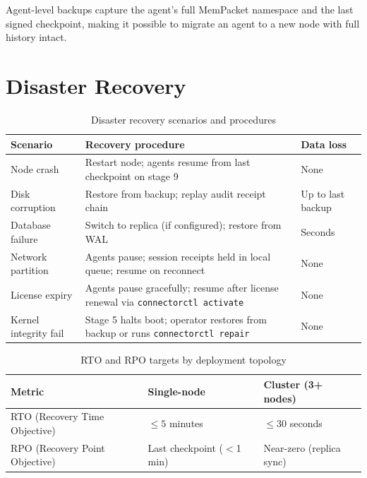 Agent-level backups capture the agent's full MemPacket namespace and the last
signed checkpoint, making it possible to migrate an agent to a new node with
full history intact.

\section{Disaster Recovery}

\begin{table}[H]
\centering
\renewcommand{\arraystretch}{1.5}
\begin{tabularx}{\textwidth}{@{}lXl@{}}
\toprule
\textbf{Scenario} & \textbf{Recovery procedure} & \textbf{Data loss} \\
\midrule
Node crash            & Restart node; agents resume from last checkpoint on stage 9 & None \\
Disk corruption       & Restore from backup; replay audit receipt chain & Up to last backup \\
Database failure      & Switch to replica (if configured); restore from WAL & Seconds \\
Network partition     & Agents pause; session receipts held in local queue; resume on reconnect & None \\
License expiry        & Agents pause gracefully; resume after license renewal via \texttt{connectorctl activate} & None \\
Kernel integrity fail & Stage 5 halts boot; operator restores from backup or runs \texttt{connectorctl repair} & None \\
\bottomrule
\end{tabularx}
\caption{Disaster recovery scenarios and procedures}
\end{table}

\begin{table}[H]
\centering
\renewcommand{\arraystretch}{1.4}
\begin{tabularx}{\textwidth}{@{}lXX@{}}
\toprule
\textbf{Metric} & \textbf{Single-node} & \textbf{Cluster (3+ nodes)} \\
\midrule
RTO (Recovery Time Objective) & $\leq 5$ minutes      & $\leq 30$ seconds \\
RPO (Recovery Point Objective)& Last checkpoint ($<$1 min) & Near-zero (replica sync) \\
\bottomrule
\end{tabularx}
\caption{RTO and RPO targets by deployment topology}
\end{table}

